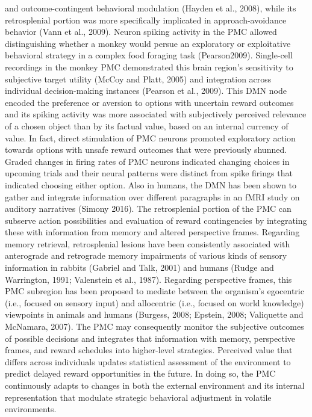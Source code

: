 \documentclass{article} %
\begin{document}
and outcome-contingent behavioral modulation (Hayden et al., 2008),
while its retrosplenial portion was
more specifically implicated in approach-avoidance behavior (Vann et al., 2009).
Neuron spiking activity in the PMC allowed distinguishing
whether a monkey would persue an exploratory or exploitative
behavioral strategy in a complex food foraging task (Pearson2009).
Single-cell recordings in the monkey PMC
demonstrated this brain region's sensitivity to
subjective target utility (McCoy and Platt, 2005) and integration
across individual decision-making instances (Pearson et al., 2009).
This DMN node encoded the
preference or aversion to options with uncertain reward outcomes
and its spiking activity was more associated with
subjectively perceived relevance of a chosen object
than by its factual value, based on an internal currency of value.
In fact, direct stimulation of PMC neurons
promoted exploratory action towards options
with unsafe reward outcomes that were previously shunned.
Graded changes in firing rates of PMC neurons
indicated changing choices in upcoming trials and their neural patterns were
distinct from spike firings that indicated choosing either option.
Also in humans,
the DMN has been shown to gather and integrate information
over different paragraphs in an fMRI study on auditory narratives (Simony 2016).
%
The retrosplenial portion of the PMC can subserve action possibilities
and evaluation of reward contingencies by integrating these with
information from memory and altered perspective frames.
Regarding memory retrieval, retrosplenial lesions have been
consistently associated with anterograde and retrograde memory impairments
of various kinds of sensory information
in rabbits (Gabriel and Talk, 2001) and humans
(Rudge and Warrington, 1991; Valenstein et al., 1987).
Regarding perspective frames, this PMC subregion has been
proposed to mediate between the organism's egocentric
(i.e., focused on sensory input) and
allocentric (i.e., focused on world knowledge) viewpoints
in animals and humans
(Burgess, 2008; Epstein, 2008; Valiquette and McNamara, 2007).
%
The PMC may consequently monitor the subjective outcomes
of possible decisions and integrates that information
with memory, perspective frames, and
reward schedules into higher-level strategies.
Perceived value that differs across individuals updates
statistical assessment of the environment
to predict delayed reward opportunities in the future.
In doing so, the PMC continuously adapts to changes
in both the external environment and its internal representation
that modulate strategic behavioral adjustment in volatile environments.
\end{document}
